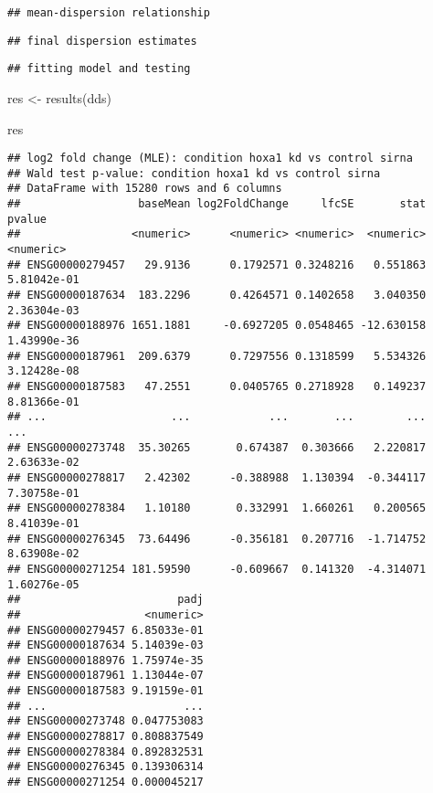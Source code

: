 \documentclass[
]{article}
\newenvironment{Shaded}{\begin{snugshade}}{\end{snugshade}}
\newcommand{\FunctionTok}[1]{\textcolor[rgb]{0.00,0.00,0.00}{#1}}
\newcommand{\NormalTok}[1]{#1}
\newcommand{\OtherTok}[1]{\textcolor[rgb]{0.56,0.35,0.01}{#1}}
\begin{document}
\begin{verbatim}
## mean-dispersion relationship
\end{verbatim}

\begin{verbatim}
## final dispersion estimates
\end{verbatim}

\begin{verbatim}
## fitting model and testing
\end{verbatim}

\begin{Shaded}
\begin{Highlighting}[]
\NormalTok{res }\OtherTok{\textless{}{-}} \FunctionTok{results}\NormalTok{(dds)}

\NormalTok{res}
\end{Highlighting}
\end{Shaded}

\begin{verbatim}
## log2 fold change (MLE): condition hoxa1 kd vs control sirna 
## Wald test p-value: condition hoxa1 kd vs control sirna 
## DataFrame with 15280 rows and 6 columns
##                  baseMean log2FoldChange     lfcSE       stat      pvalue
##                 <numeric>      <numeric> <numeric>  <numeric>   <numeric>
## ENSG00000279457   29.9136      0.1792571 0.3248216   0.551863 5.81042e-01
## ENSG00000187634  183.2296      0.4264571 0.1402658   3.040350 2.36304e-03
## ENSG00000188976 1651.1881     -0.6927205 0.0548465 -12.630158 1.43990e-36
## ENSG00000187961  209.6379      0.7297556 0.1318599   5.534326 3.12428e-08
## ENSG00000187583   47.2551      0.0405765 0.2718928   0.149237 8.81366e-01
## ...                   ...            ...       ...        ...         ...
## ENSG00000273748  35.30265       0.674387  0.303666   2.220817 2.63633e-02
## ENSG00000278817   2.42302      -0.388988  1.130394  -0.344117 7.30758e-01
## ENSG00000278384   1.10180       0.332991  1.660261   0.200565 8.41039e-01
## ENSG00000276345  73.64496      -0.356181  0.207716  -1.714752 8.63908e-02
## ENSG00000271254 181.59590      -0.609667  0.141320  -4.314071 1.60276e-05
##                        padj
##                   <numeric>
## ENSG00000279457 6.85033e-01
## ENSG00000187634 5.14039e-03
## ENSG00000188976 1.75974e-35
## ENSG00000187961 1.13044e-07
## ENSG00000187583 9.19159e-01
## ...                     ...
## ENSG00000273748 0.047753083
## ENSG00000278817 0.808837549
## ENSG00000278384 0.892832531
## ENSG00000276345 0.139306314
## ENSG00000271254 0.000045217
\end{verbatim}
\end{document}
